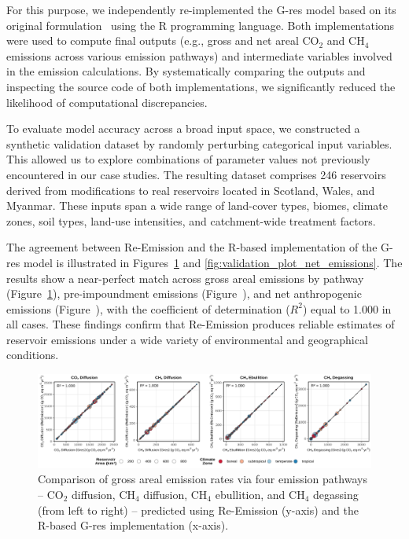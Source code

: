 \documentclass[final,1p,times]{elsarticle}
\begin{document}
For this purpose, we independently re-implemented the G-res model based on its original formulation~\cite{Prairie2021} using the R programming language. Both implementations were used to compute final outputs (e.g., gross and net areal CO$_2$ and CH$_4$ emissions across various emission pathways) and intermediate variables involved in the emission calculations. 
By systematically comparing the outputs and inspecting the source code of both implementations, we significantly reduced the likelihood of computational discrepancies.

To evaluate model accuracy across a broad input space, we constructed a synthetic validation dataset by randomly perturbing categorical input variables.
This allowed us to explore combinations of parameter values not previously encountered in our case studies. 
The resulting dataset comprises 246 reservoirs derived from modifications to real reservoirs located in Scotland, Wales, and Myanmar. 
These inputs span a wide range of land-cover types, biomes, climate zones, soil types, land-use intensities, and catchment-wide treatment factors.

The agreement between Re-Emission and the R-based implementation of the G-res model is illustrated in Figures~\ref{fig:validation_plot_gross_emissions} and \ref{fig:validation_plot_net_emissions}. 
The results show a near-perfect match across gross areal emissions by pathway (Figure~\ref{fig:validation_plot_gross_emissions}), pre-impoundment emissions (Figure~), and net anthropogenic emissions (Figure~), with the coefficient of determination ($R^2$) equal to 1.000 in all cases.
These findings confirm that Re-Emission produces reliable estimates of reservoir emissions under a wide variety of environmental and geographical conditions.

\begin{figure}[ht]
    \centering
    \includegraphics[width=1.0\textwidth]{figures/comparison_plot.pdf}
    \caption{{Comparison of gross areal emission rates via four emission pathways -- CO$_2$ diffusion, CH$_4$ diffusion, CH$_4$ ebullition, and CH$_4$ degassing (from left to right) -- predicted using Re-Emission (y-axis) and the R-based G-res implementation (x-axis).}}
    \label{fig:validation_plot_gross_emissions}
\end{figure}
\end{document}
